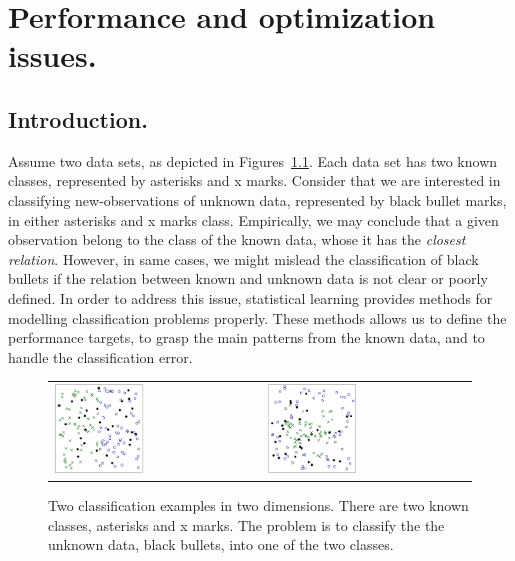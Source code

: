 \chapter{Performance and optimization issues.}

	\section{Introduction.}

		Assume two data sets, as depicted in 
		Figures~\ref{fig:chap1_scatters}. Each data set has two known classes, 
		represented by asterisks and x marks. Consider that we are interested in 
		classifying new-observations of unknown data, represented by black bullet 
		marks, in either asterisks and x marks class. 
      Empirically, we may conclude that a given observation belong to the class 
		of the known  data, whose it has the \emph{closest relation}. However, 
      in same cases,  we might mislead the  classification of black bullets if the 
		relation between known and unknown data is not clear or poorly defined. 
      In order to address this issue, statistical learning provides methods 
		for modelling classification problems properly. These methods allows us to 
		define the performance targets, to grasp the main patterns from the known data, 
		and to handle the classification error.

		\begin{figure}
			\centering
			\begin{tabular}{l@{}l@{}}
		 		\includegraphics[width=0.45\textwidth]{inputs/img/chap1_scatter_intro_ds1} &
				\includegraphics[width=0.45\textwidth]{inputs/img/chap1_scatter_intro_ds2} \\
			\end{tabular}
			\caption{Two classification examples in two dimensions. There are two known classes, asterisks and x marks. The problem is to classify the the unknown data, black bullets, into one of the two classes.}
		  	\label{fig:chap1_scatters}
		\end{figure}


